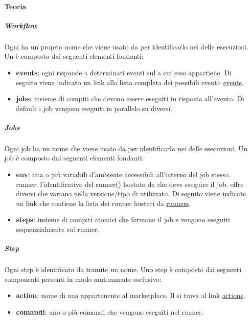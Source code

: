 \paragraph{Teoria}

\subparagraph{Workflow}
Ogni  ha un proprio nome che viene usato da  per identificarlo nei  delle esecuzioni.
Un  è composto dai seguenti elementi fondanti:
\begin{itemize}
    \item \textbf{events}: ogni  risponde a determinati eventi sul  a cui esso appartiene.
    Di seguito viene indicato un link alla lista completa dei possibili eventi: \href{https://docs.github.com/en/actions/writing-workflows/choosing-when-your-workflow-runs/events-that-trigger-workflows}{events}.

    \item \textbf{jobs}: insieme di compiti che devono essere eseguiti in risposta all'evento.
    Di default i job vengono eseguiti in parallelo su  diversi.
\end{itemize}

\subparagraph{Jobs}
Ogni job ha un nome che viene usato da  per identificarlo nei  delle esecuzioni.
Un job è composto dai seguenti elementi fondanti:

\begin{itemize}
    \item \textbf{env}: una o più variabili d'ambiente accessibili all'interno del job stesso.
    runner: l'identificativo del runner() hostato da  che deve eseguire il job.
     offre diversi  che variano nella versione/tipo di  utilizzato.
    Di seguito viene indicato un link che contiene la lista dei runner hostati da  \href{https://docs.github.com/en/actions/writing-workflows/workflow-syntax-for-github-actions#choosing-github-hosted-runners}{runners}. 
    \item \textbf{steps}: insieme di compiti atomici che formano il job e vengono eseguiti  sequenzialmente sul runner.
\end{itemize}

\subparagraph{Step}
Ogni step è identificato da  tramite un nome.
Uno step è composto dai seguenti componenti presenti in modo mutuamente esclusivo:
\begin{itemize}
    \item \textbf{action}: nome di una  appartenente al marketplace.
    Il  si trova al link \href{https://github.com/marketplace?type=actions}{actions}.
    
    \item \textbf{comandi}: uno o più comandi che vengono eseguiti nel runner.
\end{itemize}


